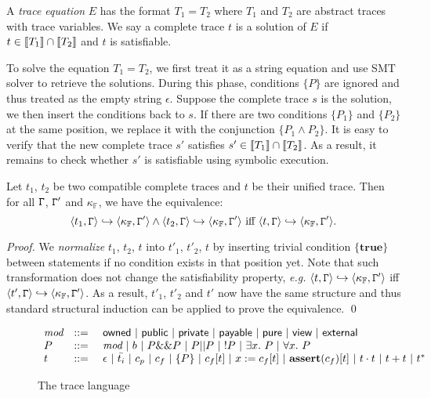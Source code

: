 A \emph{trace equation} $E$ has the format $T_1 = T_2$ where $T_1$ and $T_2$ are abstract traces with trace variables. We say a complete trace $t$ is a solution of $E$ if $t \in \llbracket T_1 \rrbracket \cap \llbracket T_2 \rrbracket$ and $t$ is satisfiable.  

To solve the equation $T_1 = T_2$, we first treat it as a string equation and use SMT solver to retrieve the solutions. During this phase, conditions $\{P\}$ are ignored and thus treated as the empty string $\epsilon$. Suppose the complete trace $s$ is the solution, we then insert the conditions back to $s$. If there are two conditions $\{P_1\}$ and $\{P_2\}$ at the same position, we replace it with the conjunction $\{P_1 \wedge P_2\}$. It is easy to verify that the new complete trace $s'$ satisfies $s' \in \llbracket T_1 \rrbracket \cap \llbracket T_2 \rrbracket$. As a result, it remains to check whether $s'$ is satisfiable using symbolic execution.

\begin{proposition}
Let $t_1$, $t_2$ be two compatible complete traces and $t$ be their unified trace. Then for all $\mathtt{\Gamma}$, $\mathtt{\Gamma}'$ and $\kappa_\mathbb{F}$, we have the equivalence:
$$
\langle t_1,\mathtt{\Gamma} \rangle \hookrightarrow \langle \kappa_{\mathbb{F}},\mathtt{\Gamma}' \rangle \wedge \langle t_2,\mathtt{\Gamma} \rangle \hookrightarrow \langle \kappa_{\mathbb{F}},\mathtt{\Gamma}' \rangle \textrm{ iff } \langle t,\mathtt{\Gamma} \rangle \hookrightarrow \langle \kappa_{\mathbb{F}},\mathtt{\Gamma}' \rangle.
$$
	\end{proposition}
\begin{proof}
	We \emph{normalize} $t_1$, $t_2$, $t$ into $t'_1$, $t'_2$, $t$ by inserting trivial condition $\{\textbf{true}\}$ between statements if no condition exists in that position yet. Note that such transformation does not change the satisfiability property, \emph{e.g.} $\langle t ,\mathtt{\Gamma} \rangle \hookrightarrow \langle \kappa_{\mathbb{F}},\mathtt{\Gamma}' \rangle$ iff $\langle t',\mathtt{\Gamma} \rangle \hookrightarrow \langle \kappa_{\mathbb{F}},\mathtt{\Gamma}' \rangle$. As a result, $t'_1$, $t'_2$ and $t'$ now have the same structure and thus standard structural induction can be applied to prove the equivalence. \qed
	\end{proof}

\begin{figure}[t]
$
\begin{array}{lcl}
\textit{mod}&::=~&\textsf{owned}~|~ \textsf{public}~|~\textsf{private}~|~\textsf{payable}~|~\textsf{pure}~|~\textsf{view}~|~\textsf{external}\\
P&::=~&\textit{mod}~|~ b ~|~ P \&\& P ~|~ P || P ~|~ !P~|~\exists x.~P~|~ \forall x.~P\\
t&::=~&\epsilon~|~\bar{t_i}~|~c_{p}~|~c_f~|~\{P\}~|~c_f[t]~|~x:=c_f[t]~|~\textbf{assert}(c_f)[t]~|~t \cdot t~|~t+t~|~t^*
\end{array}
$
\caption{The trace language}\label{fig:assert}
\end{figure}

